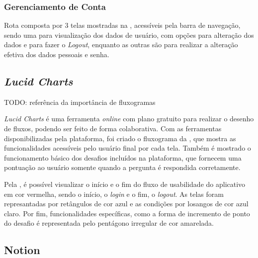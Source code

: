 
\subsubsection{Gerenciamento de Conta}

Rota composta por 3 telas mostradas na , acessíveis pela barra de navegação, sendo uma para visualização dos dados de usuário, com opções para alteração dos dados e para fazer o \textit{Logout}, enquanto as outras são para realizar a alteração efetiva dos dados pessoais e senha.


\subsection{\textit{Lucid Charts}}

TODO: referência da importância de fluxogramas

\textit{Lucid Charts} é uma ferramenta \textit{online} com plano gratuito para realizar o desenho de fluxos, podendo ser feito de forma colaborativa. Com as ferramentas disponibilizadas pela plataforma, foi criado o fluxograma da , que mostra as funcionalidades acessíveis pelo usuário final por cada tela. Também é mostrado o funcionamento básico dos desafios incluídos na plataforma, que fornecem uma pontuação ao usuário somente quando a pergunta é respondida corretamente.


Pela , é possível visualizar o início e o fim do fluxo de usabilidade do aplicativo em cor vermelha, sendo o início, o \textit{login} e o fim, o \textit{logout}. As telas foram represantadas por retângulos de cor azul e as condições por losangos de cor azul claro. Por fim, funcionalidades específicas, como a forma de incremento de ponto do desafio é representada pelo pentágono irregular de cor amarelada.

\subsection{Notion}

